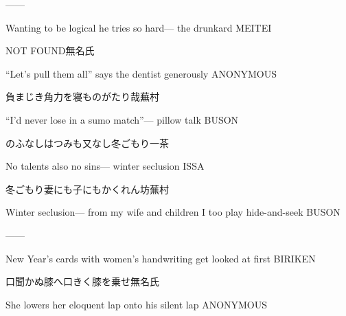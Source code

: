 \begin{haiku}
   ---\hfill{---}

    \vin{} Wanting to be logical
    \vin{} \vin{} he tries so hard---
    \vin{} \vin{} \vin{} the drunkard \hspace{\fill} MEITEI
\end{haiku}

\begin{haiku}
    {NOT FOUND}\hfill{\FH 無名氏}

    \vin{} ``Let's pull them all''
    \vin{} \vin{} says the dentist
    \vin{} \vin{} \vin{} generously \hspace{\fill} ANONYMOUS
\end{haiku}

\begin{haiku}
    {\FH 負まじき角力を寝ものがたり哉}\hfill{\FH 蕪村}

    \vin{} ``I'd never lose
    \vin{} \vin{} in a sumo match''---
    \vin{} \vin{} \vin{} pillow talk \hspace{\fill} BUSON
\end{haiku}

\begin{haiku}
    {\FH のふなしはつみも又なし冬ごもり}\hfill{\FH 一茶}

    \vin{} No talents
    \vin{} \vin{} also no sins---
    \vin{} \vin{} \vin{} winter seclusion \hspace{\fill} ISSA
\end{haiku}

\begin{haiku}
    {\FH 冬ごもり妻にも子にもかくれん坊}\hfill{\FH 蕪村}

    \vin{} Winter seclusion---
    \vin{} \vin{} from my wife and children
    \vin{} \vin{} \vin{} I too play hide-and-seek \hspace{\fill} BUSON
\end{haiku}

\begin{haiku}
   ---\hfill{---}

    \vin{} New Year's cards
    \vin{} \vin{} with women's handwriting
    \vin{} \vin{} \vin{} get looked at first \hspace{\fill} BIRIKEN
\end{haiku}

\begin{haiku}
    {口聞かぬ膝へ口きく膝を乗せ}\hfill{\FH 無名氏}

    \vin{} She lowers
    \vin{} \vin{} her eloquent lap
    \vin{} \vin{} \vin{} onto his silent lap \hspace{\fill} ANONYMOUS
\end{haiku}

